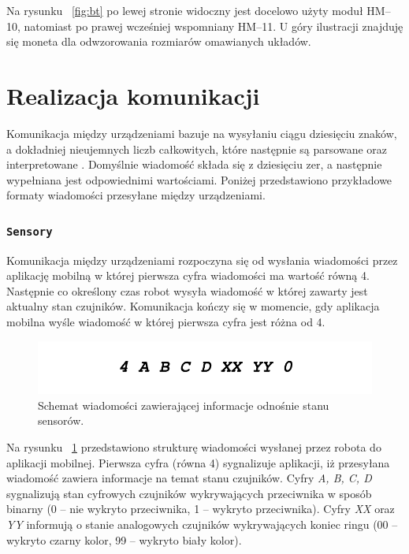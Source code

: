 Na rysunku ~\ref{fig:bt} po lewej stronie widoczny jest docelowo użyty moduł HM–10, natomiast po prawej wcześniej wspomniany HM–11. U góry ilustracji znajduję się moneta dla odwzorowania rozmiarów omawianych układów.

\section{Realizacja komunikacji}
Komunikacja między urządzeniami bazuje na wysyłaniu ciągu dziesięciu znaków, a dokładniej nieujemnych liczb całkowitych, które następnie są parsowane oraz interpretowane \cite{Forbot}. Domyślnie wiadomość składa się z dziesięciu zer, a następnie wypełniana jest odpowiednimi wartościami. Poniżej przedstawiono przykładowe formaty wiadomości przesyłane między urządzeniami.

 \subsubsection{\lstinline$Sensory$}
Komunikacja między urządzeniami rozpoczyna się od wysłania wiadomości przez aplikację mobilną w której pierwsza cyfra wiadomości ma wartość równą 4. Następnie co określony czas robot wysyła wiadomość w której zawarty jest aktualny stan czujników. Komunikacja kończy się w momencie, gdy aplikacja mobilna wyśle wiadomość w której pierwsza cyfra jest różna od 4.

\begin{figure}[H]
	\centering
		\includegraphics[width=0.75\linewidth]{pic03/sensors.pdf}
	\caption{Schemat wiadomości zawierającej informacje odnośnie stanu sensorów.}
	\label{fig:sensors_communication}	
\end{figure}

Na rysunku ~\ref{fig:sensors_communication} przedstawiono strukturę wiadomości wysłanej przez robota do aplikacji mobilnej. Pierwsza cyfra (równa 4) sygnalizuje aplikacji, iż przesyłana wiadomość zawiera informacje na temat stanu czujników. Cyfry \textit{A, B, C, D} sygnalizują stan cyfrowych czujników wykrywających przeciwnika w sposób binarny (0 – nie wykryto przeciwnika, 1 – wykryto przeciwnika). Cyfry \textit{XX} oraz \textit{YY} informują o stanie analogowych czujników wykrywających koniec ringu (00 – wykryto czarny kolor, 99 – wykryto biały kolor).

